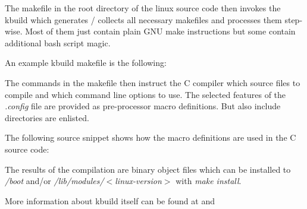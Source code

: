 The makefile in the root directory of the linux source code then invokes the kbuild which 
generates / collects all necessary makefiles and processes them step-wise. 
Most of them just contain plain GNU make instructions but some contain additional bash script magic. 

An example kbuild makefile is the following:

  
The commands in the makefile then instruct the C compiler which source files to compile and 
which command line options to use. The selected features of the {\it .config} file are 
provided as pre-processor macro definitions. But also include directories are enlisted. 

The following source snippet shows how the macro definitions are used in the C source code:

The results of the compilation are binary object files which can be installed to 
{\it /boot} and/or {\it /lib/modules/$<$linux-version$>$} with {\it make install}. 

More information about kbuild itself can be found at \cite{Kernel_5}
and
\cite{Kernel_6}
